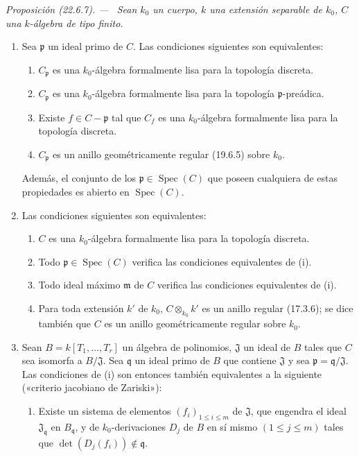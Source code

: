 \documentclass[10pt,oneside]{book}
\makeatletter
\newcommand{\setmanualcurrentlabel}[1]{\def\@currentlabel{#1}}
\newcommand{\oldpage}[2][]{%
  \setcounter{footnote}{0}%
  \marginpar{\scriptsize\textbf{#1}~|~#2}\ignorespaces}
\newenvironment{proposition}[1][]{%
  \setmanualcurrentlabel{#1}\par\medskip\noindent\itshape Proposición (#1). ---\ }{\par}
\providecommand{\setmin}{-}%
\makeatother
\begin{document}
\begin{proposition}[22.6.7]
\label{0.22.6.7-es}
Sean $k_0$ un cuerpo, $k$ una extensión separable de $k_0$, $C$ una
$k$-álgebra de tipo finito.
\begin{enumerate}
  \item[\rm(i)] Sea $\mathfrak p$ un ideal primo de $C$. Las condiciones
  siguientes son equivalentes:
  \begin{enumerate}
    \item[\textup{a)}] $C_{\mathfrak p}$ es una $k_0$-álgebra formalmente lisa para
    la topología discreta.
    \item[\textup{b)}] $C_{\mathfrak p}$ es una $k_0$-álgebra formalmente lisa para
    la topología $\mathfrak p$-preádica.
    \item[\textup{c)}] Existe $f\in C\setmin\mathfrak p$ tal que $C_f$ es una
    $k_0$-álgebra formalmente lisa para la topología discreta.
    \item[\textup{d)}] $C_{\mathfrak p}$ es un anillo geométricamente regular
    \textup{(19.6.5)} sobre $k_0$.
  \end{enumerate}
  Además, el conjunto de los $\mathfrak p\in\operatorname{Spec}(C)$ que poseen cualquiera de
  estas propiedades es abierto en $\operatorname{Spec}(C)$.
  \item[\rm(ii)] Las condiciones siguientes son equivalentes:
  \begin{enumerate}
    \item[\textup{a)}] $C$ es una $k_0$-álgebra formalmente lisa para la topología
    discreta.
    \item[\textup{b)}] Todo $\mathfrak p\in\operatorname{Spec}(C)$ verifica las condiciones
    equivalentes de \textup{(i)}.
    \item[\textup{c)}] Todo ideal máximo $\mathfrak m$ de $C$ verifica las condiciones
    equivalentes de \textup{(i)}.
    \item[\textup{d)}] Para toda extensión $k'$ de $k_0$, $C\otimes_{k_0}k'$ es un
    anillo regular \textup{(17.3.6)}; se dice también que $C$ es un anillo
    geométricamente regular sobre $k_0$.
  \end{enumerate}

  \oldpage[0\textsubscript{IV-1}]{208}

  \item[\rm(iii)] Sean $B=k[T_1,\ldots,T_r]$ un álgebra de polinomios,
  $\mathfrak J$ un ideal de $B$ tales que $C$ sea isomorfa a
  $B/\mathfrak J$. Sea $\mathfrak q$ un ideal primo de $B$ que contiene
  $\mathfrak J$ y sea $\mathfrak p=\mathfrak q/\mathfrak J$. Las condiciones
  de \textup{(i)} son entonces también equivalentes a la siguiente \textup{(«criterio jacobiano de
  Zariski»)}:
  \begin{enumerate}
    \item[\textup{e)}] Existe un sistema de elementos
    $(f_i)_{1\leq i\leq m}$ de $\mathfrak J$, que engendra el ideal
    $\mathfrak J_{\mathfrak q}$ en $B_{\mathfrak q}$, y de
    $k_0$-derivaciones $D_j$ de $B$ en sí mismo $(1\leq j\leq m)$ tales que
    $\det(D_j(f_i))\notin\mathfrak q$.
  \end{enumerate}
\end{enumerate}
\end{proposition}
\end{document}
